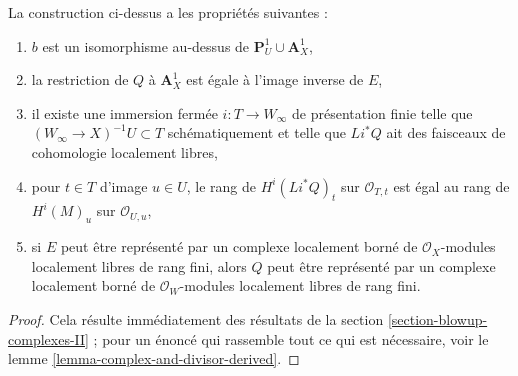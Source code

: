 \begin{lemma}
\label{lemma-graph-construction}
La construction ci-dessus a les propriétés suivantes :
\begin{enumerate}
\item $b$ est un isomorphisme au-dessus de $\mathbf{P}^1_U \cup \mathbf{A}^1_X$,
\item la restriction de $Q$ à $\mathbf{A}^1_X$
est égale à l'image inverse de $E$,
\item il existe une immersion fermée $i : T \to W_\infty$
de présentation finie telle que $(W_\infty \to X)^{-1}U \subset T$
schématiquement et telle que $Li^*Q$ ait des faisceaux de cohomologie
localement libres,
\item pour $t \in T$ d'image $u \in U$, le
rang de $H^i(Li^*Q)_t$ sur $\mathcal{O}_{T, t}$ est égal au rang
de $H^i(M)_u$ sur $\mathcal{O}_{U, u}$,
\item si $E$ peut être représenté par un complexe localement borné de
$\mathcal{O}_X$-modules localement libres de rang fini, alors $Q$ peut être représenté
par un complexe localement borné de $\mathcal{O}_W$-modules localement libres de rang fini.
\end{enumerate}
\end{lemma}

\begin{proof}
Cela résulte immédiatement des résultats de la
section \ref{section-blowup-complexes-II} ; pour un énoncé
qui rassemble tout ce qui est nécessaire, voir le
lemme \ref{lemma-complex-and-divisor-derived}.
\end{proof}


















